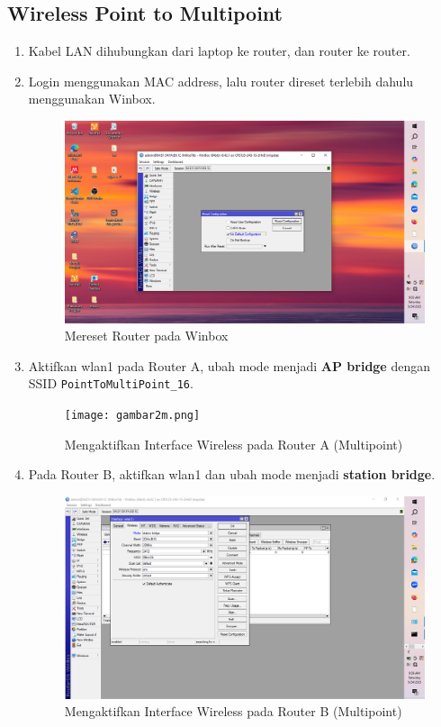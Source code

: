 \subsection{Wireless Point to Multipoint}
\begin{enumerate}
    \item Kabel LAN dihubungkan dari laptop ke router, dan router ke router.
    \item Login menggunakan MAC address, lalu router direset terlebih dahulu menggunakan Winbox.
    \begin{figure}[H]
        \centering
        \includegraphics[width=0.5\linewidth]{gambar1.png}
        \caption{Mereset Router pada Winbox}
        \label{fig:reset-router-multi}
    \end{figure}

    \item Aktifkan wlan1 pada Router A, ubah mode menjadi \textbf{AP bridge} dengan SSID \texttt{PointToMultiPoint\_16}.
    \begin{figure}[H]
        \centering
        \texttt{[image: gambar2m.png]}
        \caption{Mengaktifkan Interface Wireless pada Router A (Multipoint)}
        \label{fig:aktif-wlan-a-multi}
    \end{figure}

    \item Pada Router B, aktifkan wlan1 dan ubah mode menjadi \textbf{station bridge}.
    \begin{figure}[H]
        \centering
        \includegraphics[width=0.5\linewidth]{gambar3ma.png}
        \caption{Mengaktifkan Interface Wireless pada Router B (Multipoint)}
        \label{fig:aktif-wlan-b-multi}
    \end{figure}


\end{enumerate}
